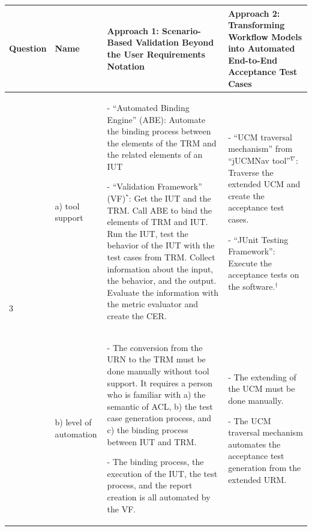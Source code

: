 \newpage
{}
\begin{landscape}
	\begin{small}
	\begin{table}
		\caption{Synthesis Matrix part 2/2.}
		\begin{longtable}[h]{p{1.3cm}|>{\raggedright}p{2.6cm}|>{}p{9.2cm}|>{}p{9.2cm}}
			\hline
			\textbf{Question} 
			& \textbf{Name} 
			& \textbf{Approach 1: Scenario-Based Validation Beyond the User Requirements Notation} 
			& \textbf{Approach 2: Transforming Workflow Models into Automated End-to-End Acceptance Test Cases}\\ \hline
			\multirow{2}{*}{3 \rotatebox[origin=r]{90}{\textbf{Tools}}} 
			& a) tool support 
			& - \enquote{Automated Binding Engine} (ABE): Automate the binding process between the elements of the TRM and the related elements of an IUT
			
			- \enquote{Validation Framework} (VF)$^*$: Get the IUT and the TRM. Call ABE to bind the elements of TRM and IUT. Run the IUT, test the behavior of the IUT with the test cases from TRM. Collect information about the input, the behavior, and the output. Evaluate the information with the metric evaluator and create the CER.
			& 		
			- \enquote{UCM traversal mechanism} from \enquote{jUCMNav tool}$^\nabla$: Traverse the extended UCM and create the acceptance test cases.
			
			- \enquote{JUnit Testing Framework}: Execute the acceptance tests on the software.$^\dagger$\\ 
			\cline{2-4}
			& b) level of automation 
			& - The conversion from the URN to the TRM must be done manually without tool support. It requires a person who is familiar with a) the semantic of ACL, b) the test case generation process, and c) the binding process between IUT and TRM.  
			
			- The binding process, the execution of the IUT, the test process, and the report creation is all automated by the VF.
			& 
			- The extending of the UCM must be done manually.
			
			- The UCM traversal mechanism automates the acceptance test generation from the extended URM.
			

\end{longtable}
\end{table}
\end{small}
\end{landscape}
